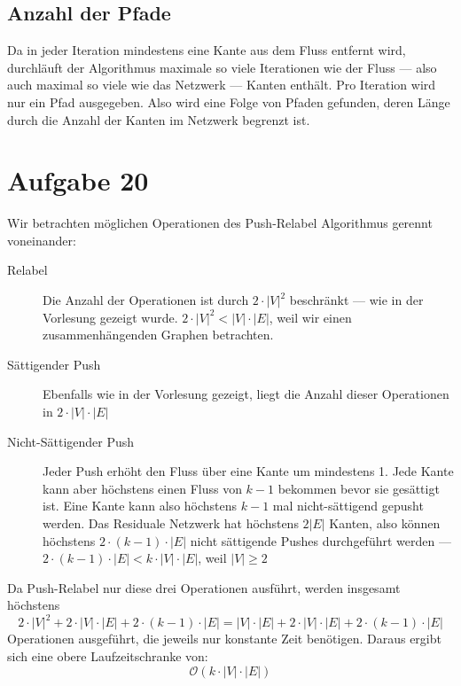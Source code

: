 \documentclass[parskip=half,a4paper]{scrartcl}
\begin{document}
\subsection*{Anzahl der Pfade}

Da in jeder Iteration mindestens eine Kante aus dem Fluss entfernt wird, durchläuft der Algorithmus maximale so viele Iterationen wie der Fluss --- also auch maximal so viele wie das Netzwerk --- Kanten enthält. Pro Iteration wird nur ein Pfad ausgegeben. Also wird eine Folge von Pfaden gefunden, deren Länge durch die Anzahl der Kanten im Netzwerk begrenzt ist.

\section*{Aufgabe 20}

Wir betrachten möglichen Operationen des Push-Relabel Algorithmus gerennt voneinander:

\begin{description}
\item[Relabel] Die Anzahl der Operationen ist durch $2 \cdot |V|^2$ beschränkt --- wie in der Vorlesung gezeigt wurde. $2 \cdot |V|^2 < |V| \cdot |E|$, weil wir einen zusammenhängenden Graphen betrachten.
\item[Sättigender Push] Ebenfalls wie in der Vorlesung gezeigt, liegt die Anzahl dieser Operationen in $2 \cdot |V| \cdot |E|$
\item[Nicht-Sättigender Push] Jeder Push erhöht den Fluss über eine Kante um mindestens 1. Jede Kante kann aber höchstens einen Fluss von $k-1$ bekommen bevor sie gesättigt ist. Eine Kante kann also höchstens $k-1$ mal nicht-sättigend gepusht werden. Das Residuale Netzwerk hat höchstens $2|E|$ Kanten, also können höchstens $2 \cdot (k-1) \cdot |E|$ nicht sättigende Pushes durchgeführt werden --- $2 \cdot (k-1) \cdot |E| < k \cdot |V| \cdot |E|$, weil $|V| \ge 2$
\end{description}

Da Push-Relabel nur diese drei Operationen ausführt, werden insgesamt höchstens \[2 \cdot |V|^2 + 2 \cdot |V| \cdot |E| + 2 \cdot (k-1) \cdot |E| = |V| \cdot |E| + 2 \cdot |V| \cdot |E| + 2 \cdot (k-1) \cdot |E|\] Operationen ausgeführt, die jeweils nur konstante Zeit benötigen. Daraus ergibt sich eine obere Laufzeitschranke von: \[\mathcal{O}(k \cdot |V| \cdot |E|)\]
\end{document}
